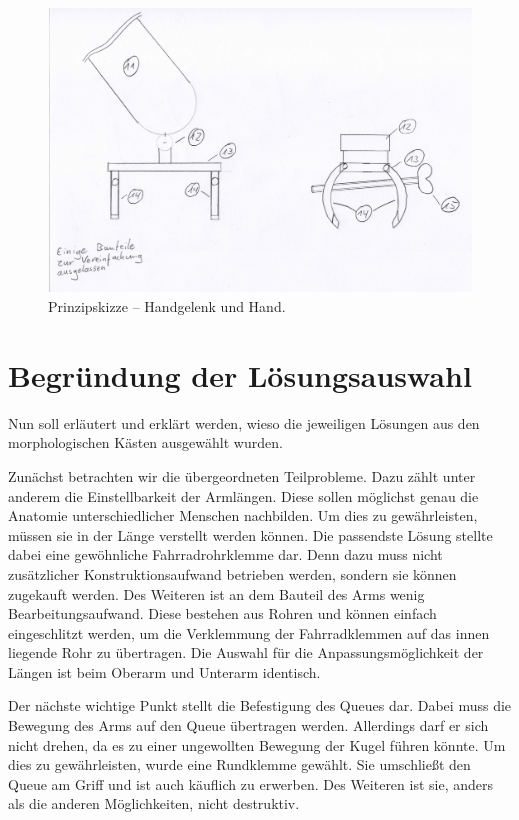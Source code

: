 			\begin{figure}[h]
				\centering
				\includegraphics[width=\textwidth]{Abb/Prinzipskizze_Handgelenk_und_Hand}
				\caption[Prinzipskizze -- Handgelenk und Hand]{Prinzipskizze -- Handgelenk und Hand.}\label{fig:prinzipskizze-handgelenk-und-hand}
			\end{figure}

	\section{Begründung der Lösungsauswahl}\label{Begruendung Loesungsauswahl}

		Nun soll erläutert und erklärt werden, wieso die jeweiligen Lösungen aus den morphologischen Kästen ausgewählt wurden.\par\medskip

		Zunächst betrachten wir die übergeordneten Teilprobleme. Dazu zählt unter anderem die Einstellbarkeit der Armlängen. Diese sollen möglichst genau die Anatomie unterschiedlicher Menschen nachbilden. Um dies zu gewährleisten, müssen sie in der Länge verstellt werden können. Die passendste Lösung stellte dabei eine gewöhnliche Fahrradrohrklemme dar. Denn dazu muss nicht zusätzlicher Konstruktionsaufwand betrieben werden, sondern sie können zugekauft werden. Des Weiteren ist an dem Bauteil des Arms wenig Bearbeitungsaufwand. Diese bestehen aus Rohren und können einfach eingeschlitzt werden, um die Verklemmung der Fahrradklemmen auf das innen liegende Rohr zu übertragen. Die Auswahl für die Anpassungsmöglichkeit der Längen ist beim Oberarm und Unterarm identisch.\par\medskip

		Der nächste wichtige Punkt stellt die Befestigung des Queues dar. Dabei muss die Bewegung des Arms auf den Queue übertragen werden. Allerdings darf er sich nicht drehen, da es zu einer ungewollten Bewegung der Kugel führen könnte. Um dies zu gewährleisten, wurde eine Rundklemme gewählt. Sie umschließt den Queue am Griff und ist auch käuflich zu erwerben. Des Weiteren ist sie, anders als die anderen Möglichkeiten, nicht destruktiv.\par\medskip
		
